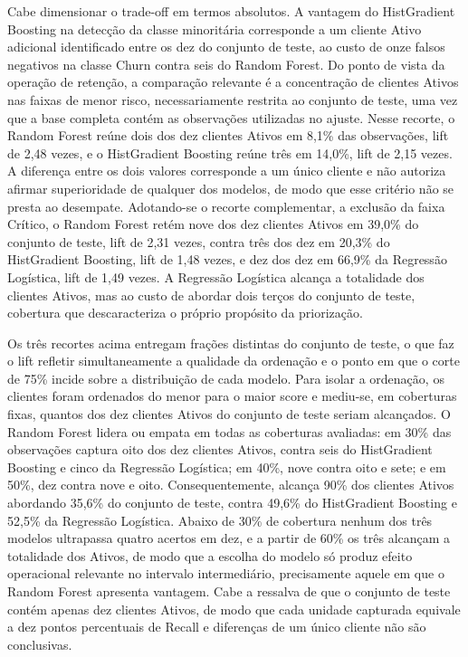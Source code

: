 Cabe dimensionar o trade-off em termos absolutos. A vantagem do HistGradient Boosting na detecção da classe minoritária corresponde a um cliente Ativo adicional identificado entre os dez do conjunto de teste, ao custo de onze falsos negativos na classe Churn contra seis do Random Forest. Do ponto de vista da operação de retenção, a comparação relevante é a concentração de clientes Ativos nas faixas de menor risco, necessariamente restrita ao conjunto de teste, uma vez que a base completa contém as observações utilizadas no ajuste. Nesse recorte, o Random Forest reúne dois dos dez clientes Ativos em 8,1\% das observações, lift de 2,48 vezes, e o HistGradient Boosting reúne três em 14,0\%, lift de 2,15 vezes. A diferença entre os dois valores corresponde a um único cliente e não autoriza afirmar superioridade de qualquer dos modelos, de modo que esse critério não se presta ao desempate. Adotando-se o recorte complementar, a exclusão da faixa Crítico, o Random Forest retém nove dos dez clientes Ativos em 39,0\% do conjunto de teste, lift de 2,31 vezes, contra três dos dez em 20,3\% do HistGradient Boosting, lift de 1,48 vezes, e dez dos dez em 66,9\% da Regressão Logística, lift de 1,49 vezes. A Regressão Logística alcança a totalidade dos clientes Ativos, mas ao custo de abordar dois terços do conjunto de teste, cobertura que descaracteriza o próprio propósito da priorização.

Os três recortes acima entregam frações distintas do conjunto de teste, o que faz o lift refletir simultaneamente a qualidade da ordenação e o ponto em que o corte de 75\% incide sobre a distribuição de cada modelo. Para isolar a ordenação, os clientes foram ordenados do menor para o maior score e mediu-se, em coberturas fixas, quantos dos dez clientes Ativos do conjunto de teste seriam alcançados. O Random Forest lidera ou empata em todas as coberturas avaliadas: em 30\% das observações captura oito dos dez clientes Ativos, contra seis do HistGradient Boosting e cinco da Regressão Logística; em 40\%, nove contra oito e sete; e em 50\%, dez contra nove e oito. Consequentemente, alcança 90\% dos clientes Ativos abordando 35,6\% do conjunto de teste, contra 49,6\% do HistGradient Boosting e 52,5\% da Regressão Logística. Abaixo de 30\% de cobertura nenhum dos três modelos ultrapassa quatro acertos em dez, e a partir de 60\% os três alcançam a totalidade dos Ativos, de modo que a escolha do modelo só produz efeito operacional relevante no intervalo intermediário, precisamente aquele em que o Random Forest apresenta vantagem. Cabe a ressalva de que o conjunto de teste contém apenas dez clientes Ativos, de modo que cada unidade capturada equivale a dez pontos percentuais de Recall e diferenças de um único cliente não são conclusivas.

